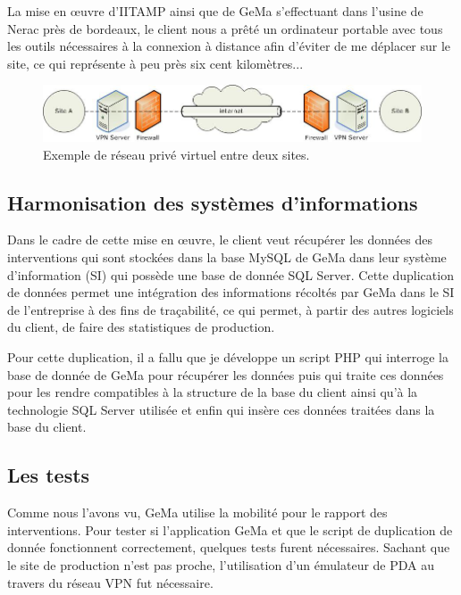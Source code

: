 La mise en \oe{}uvre d'IITAMP ainsi que de GeMa s'effectuant dans
l'usine de Nerac près de bordeaux, le client nous a prêté un ordinateur
portable avec tous les outils nécessaires à la connexion à distance afin
d'éviter de me déplacer sur le site, ce qui représente à peu près six
cent kilomètres...

\begin{figure}
  \begin{center}
    \includegraphics[scale=0.5]{images/vpn.png}
    \caption{Exemple de réseau privé virtuel entre deux sites.}
    \label{vpn}
  \end{center}
\end{figure}

\subsection{Harmonisation des systèmes d'informations} %
\label{sub:Harmonisation des systèmes d'informations}

Dans le cadre de cette mise en \oe{}uvre, le client veut récupérer les
données des interventions qui sont stockées dans la base MySQL de GeMa
dans leur système d'information (SI) qui possède une base de donnée SQL
Server. Cette duplication de données permet une intégration des
informations récoltés par GeMa dans le SI de l'entreprise à des fins de
traçabilité, ce qui permet, à partir des autres logiciels du client, de
faire des statistiques de production.

Pour cette duplication, il a fallu que je développe un script PHP qui
interroge la base de donnée de GeMa pour récupérer les données puis qui
traite ces données pour les rendre compatibles à la structure de la base
du client ainsi qu'à la technologie SQL Server utilisée et enfin qui
insère ces données traitées dans la base du client.

\subsection{Les tests} %
\label{sub:Les tests}

Comme nous l'avons vu, GeMa utilise la mobilité pour le rapport des
interventions. Pour tester si l'application GeMa et que le script de
duplication de donnée fonctionnent correctement, quelques tests furent
nécessaires. Sachant que le site de production n'est pas proche,
l'utilisation d'un émulateur de PDA au travers du réseau VPN fut
nécessaire.

